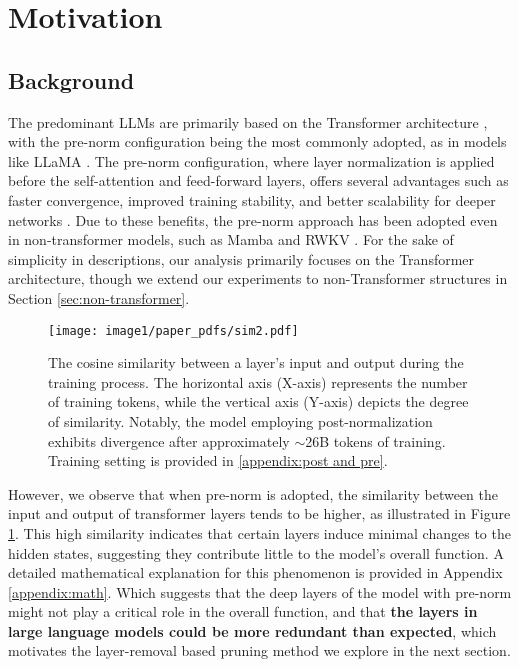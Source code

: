 	\section{Motivation}
	\subsection{Background}
	
	The predominant LLMs are primarily based on the Transformer architecture \citep{vaswani2017attention}, with the pre-norm configuration being the most commonly adopted, as in models like LLaMA \citep{touvron2023llama}. The pre-norm configuration, where layer normalization is applied before the self-attention and feed-forward layers, offers several advantages such as faster convergence, improved training stability, and better scalability for deeper networks \citep{xiong2020layer, liu2020understanding, wang2024deepnet}. Due to these benefits, the pre-norm approach has been adopted even in non-transformer models, such as  Mamba \citep{gu2023mamba} and RWKV \citep{peng2023rwkv}. For the sake of simplicity in descriptions, our analysis primarily focuses on the Transformer architecture, though we extend our experiments to non-Transformer structures in Section \ref{sec:non-transformer}. 
	
		\begin{figure}[h]
			\centering  
			\texttt{[image: image1/paper\_pdfs/sim2.pdf]}
			\caption{The cosine similarity  between a layer's input and output during the training process. The horizontal axis (X-axis) represents the number of training tokens, while the vertical axis (Y-axis) depicts the degree of similarity. Notably, the model employing post-normalization exhibits divergence after approximately $\sim$26B tokens of training. Training setting is provided in \ref{appendix:post and pre}.}
			\label{fig:background-similarity}    %
		\end{figure}
		
		However, we observe that when pre-norm is adopted, the similarity between the input and output of transformer layers tends to be higher, as illustrated in Figure \ref{fig:background-similarity}. This high similarity indicates that certain layers induce minimal changes to the hidden states, suggesting they contribute little to the model’s overall function. A detailed mathematical explanation for this phenomenon is provided in Appendix \ref{appendix:math}. Which suggests that the deep layers of the model with pre-norm might not play a critical role in the overall function, and that \textbf{the layers in large language models could be more redundant than expected}, which motivates the layer-removal based pruning method we explore in the next section.
		

